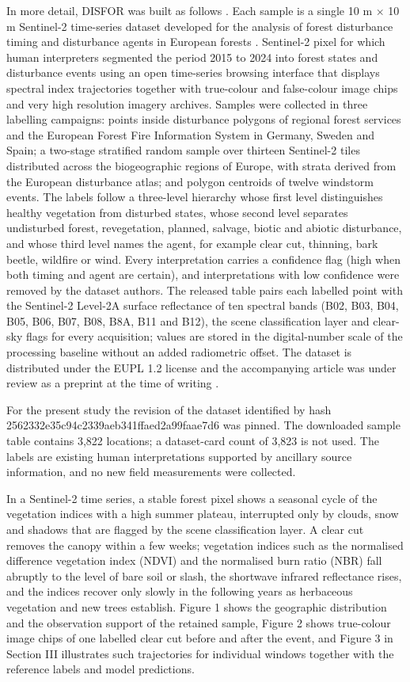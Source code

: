 \documentclass[10pt,a4paper,twocolumn]{article}
\begin{document}
In more detail, DISFOR was built as follows \cite{ref1}. Each sample is a single 10 m $\times$ 10 m Sentinel-2 time-series dataset developed for the analysis of forest disturbance timing and disturbance agents in European forests \cite{ref1}. Sentinel-2 pixel for which human interpreters segmented the period 2015 to 2024 into forest states and disturbance events using an open time-series browsing interface that displays spectral index trajectories together with true-colour and false-colour image chips and very high resolution imagery archives. Samples were collected in three labelling campaigns: points inside disturbance polygons of regional forest services and the European Forest Fire Information System in Germany, Sweden and Spain; a two-stage stratified random sample over thirteen Sentinel-2 tiles distributed across the biogeographic regions of Europe, with strata derived from the European disturbance atlas; and polygon centroids of twelve windstorm events. The labels follow a three-level hierarchy whose first level distinguishes healthy vegetation from disturbed states, whose second level separates undisturbed forest, revegetation, planned, salvage, biotic and abiotic disturbance, and whose third level names the agent, for example clear cut, thinning, bark beetle, wildfire or wind. Every interpretation carries a confidence flag (high when both timing and agent are certain), and interpretations with low confidence were removed by the dataset authors. The released table pairs each labelled point with the Sentinel-2 Level-2A surface reflectance of ten spectral bands (B02, B03, B04, B05, B06, B07, B08, B8A, B11 and B12), the scene classification layer and clear-sky flags for every acquisition; values are stored in the digital-number scale of the processing baseline without an added radiometric offset. The dataset is distributed under the EUPL 1.2 license and the accompanying article was under review as a preprint at the time of writing \cite{ref1}.

For the present study the revision of the dataset identified by hash 2562332e35c94c2339aeb341ffaed2a99faae7d6 was pinned. The downloaded sample table contains 3,822 locations; a dataset-card count of 3,823 is not used. The labels are existing human interpretations supported by ancillary source information, and no new field measurements were collected.

In a Sentinel-2 time series, a stable forest pixel shows a seasonal cycle of the vegetation indices with a high summer plateau, interrupted only by clouds, snow and shadows that are flagged by the scene classification layer. A clear cut removes the canopy within a few weeks; vegetation indices such as the normalised difference vegetation index (NDVI) and the normalised burn ratio (NBR) fall abruptly to the level of bare soil or slash, the shortwave infrared reflectance rises, and the indices recover only slowly in the following years as herbaceous vegetation and new trees establish. Figure 1 shows the geographic distribution and the observation support of the retained sample, Figure 2 shows true-colour image chips of one labelled clear cut before and after the event, and Figure 3 in Section III illustrates such trajectories for individual windows together with the reference labels and model predictions.
\end{document}

